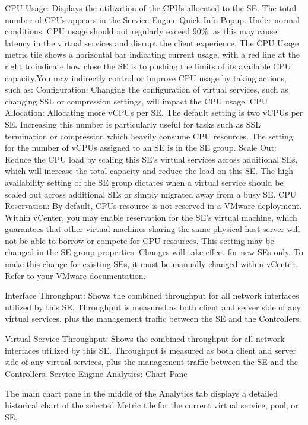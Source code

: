 \documentclass[letterpaper,10pt,english]{sphinxmanual}
\begin{document}
CPU Usage: Displays the utilization of the CPUs allocated to the SE. The total number of CPUs appears in the Service Engine Quick Info Popup. Under normal conditions, CPU usage should not regularly exceed 90\%, as this may cause latency in the virtual services and disrupt the client experience. The CPU Usage metric tile shows a horizontal bar indicating current usage, with a red line at the right to indicate how close the SE is to pushing the limits of its available CPU capacity.You may indirectly control or improve CPU usage by taking actions, such as:
Configuration: Changing the configuration of virtual services, such as changing SSL or compression settings, will impact the CPU usage.
CPU Allocation: Allocating more vCPUs per SE. The default setting is two vCPUs per SE. Increasing this number is particularly useful for tasks such as SSL termination or compression which heavily consume CPU resources. The setting for the number of vCPUs assigned to an SE is in the SE group.
Scale Out: Reduce the CPU load by scaling this SE's virtual services across additional SEs, which will increase the total capacity and reduce the load on this SE. The high availability setting of the SE group dictates when a virtual service should be scaled out across additional SEs or simply migrated away from a busy SE.
CPU Reservation: By default, CPUs resource is not reserved in a VMware deployment. Within vCenter, you may enable reservation for the SE's virtual machine, which guarantees that other virtual machines sharing the same physical host server will not be able to borrow or compete for CPU resources. This setting may be changed in the SE group properties. Changes will take effect for new SEs only. To make this change for existing SEs, it must be manually changed within vCenter. Refer to your VMware documentation.

Interface Throughput: Shows the combined throughput for all network interfaces utilized by this SE. Throughput is measured as both client and server side of any virtual services, plus the management traffic between the SE and the Controllers.

Virtual Service Throughput: Shows the combined throughput for all network interfaces utilized by this SE. Throughput is measured as both client and server side of any virtual services, plus the management traffic between the SE and the Controllers.
Service Engine Analytics: Chart Pane

The main chart pane in the middle of the Analytics tab displays a detailed historical chart of the selected Metric tile for the current virtual service, pool, or SE.
\end{document}
